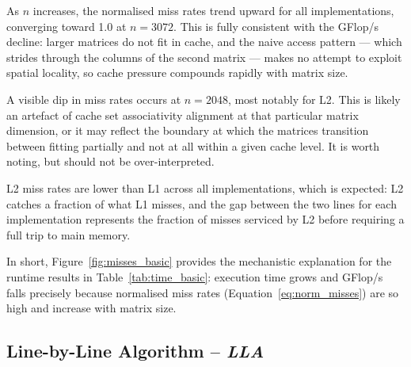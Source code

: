 \documentclass[12pt,a4paper]{article}
\begin{document}
As $n$ increases, the normalised miss rates trend upward for all
implementations, converging toward 1.0 at $n = 3072$. This is fully
consistent with the GFlop/s decline: larger matrices do not fit in cache, and
the naive access pattern --- which strides through the columns of the second
matrix --- makes no attempt to exploit spatial locality, so cache pressure
compounds rapidly with matrix size.

A visible dip in miss rates occurs at $n = 2048$, most notably for L2. This
is likely an artefact of cache set associativity alignment at that particular
matrix dimension, or it may reflect the boundary at which the matrices
transition between fitting partially and not at all within a given cache level.
It is worth noting, but should not be over-interpreted.

L2 miss rates are lower than L1 across all implementations, which is expected:
L2 catches a fraction of what L1 misses, and the gap between the two lines for
each implementation represents the fraction of misses serviced by L2 before
requiring a full trip to main memory.

In short, Figure~\ref{fig:misses_basic} provides the mechanistic explanation for the
runtime results in Table~\ref{tab:time_basic}: execution time grows and GFlop/s falls precisely because
normalised miss rates (Equation~\ref{eq:norm_misses}) are so high and increase with matrix size.

\subsection{Line-by-Line Algorithm -- \textit{LLA}}
\label{subsec:res_line}
\end{document}
